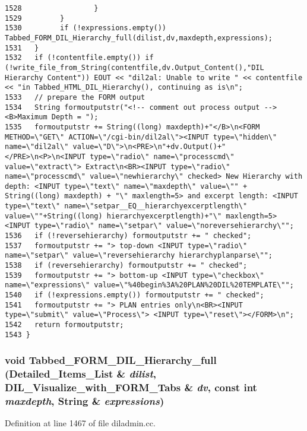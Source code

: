 \begin{verbatim}
1528                 }
1529         }
1530         if (!expressions.empty()) Tabbed_FORM_DIL_Hierarchy_full(dilist,dv,maxdepth,expressions);
1531   }
1532   if (!contentfile.empty()) if (!write_file_from_String(contentfile,dv.Output_Content(),"DIL Hierarchy Content")) EOUT << "dil2al: Unable to write " << contentfile << "in Tabbed_HTML_DIL_Hierarchy(), continuing as is\n";
1533   // prepare the FORM output
1534   String formoutputstr("<!-- comment out process output --><B>Maximum Depth = ");
1535   formoutputstr += String((long) maxdepth)+"</B>\n<FORM METHOD=\"GET\" ACTION=\"/cgi-bin/dil2al\"><INPUT type=\"hidden\" name=\"dil2al\" value=\"D\">\n<PRE>\n"+dv.Output()+"</PRE>\n<P>\n<INPUT type=\"radio\" name=\"processcmd\" value=\"extract\"> Extract\n<BR><INPUT type=\"radio\" name=\"processcmd\" value=\"newhierarchy\" checked> New Hierarchy with depth: <INPUT type=\"text\" name=\"maxdepth\" value=\"" + String((long) maxdepth) + "\" maxlength=5> and excerpt length: <INPUT type=\"text\" name=\"setpar__EQ__hierarchyexcerptlength\" value=\""+String((long) hierarchyexcerptlength)+"\" maxlength=5> <INPUT type=\"radio\" name=\"setpar\" value=\"noreversehierarchy\"";
1536   if (!reversehierarchy) formoutputstr += " checked";
1537   formoutputstr += "> top-down <INPUT type=\"radio\" name=\"setpar\" value=\"reversehierarchy hierarchyplanparse\"";
1538   if (reversehierarchy) formoutputstr += " checked";
1539   formoutputstr += "> bottom-up <INPUT type=\"checkbox\" name=\"expressions\" value=\"%40begin%3A%20PLAN%20DIL%20TEMPLATE\"";
1540   if (!expressions.empty()) formoutputstr += " checked";
1541   formoutputstr += "> PLAN entries only\n<BR><INPUT type=\"submit\" value=\"Process\"> <INPUT type=\"reset\"></FORM>\n";
1542   return formoutputstr;
1543 }
\end{verbatim}\normalsize 
{}
\subsubsection{\setlength{\rightskip}{0pt plus 5cm}void Tabbed\_\-FORM\_\-DIL\_\-Hierarchy\_\-full ({\bf Detailed\_\-Items\_\-List} \& {\em dilist}, {\bf DIL\_\-Visualize\_\-with\_\-FORM\_\-Tabs} \& {\em dv}, const int {\em maxdepth}, {\bf String} \& {\em expressions})}\label{diladmin_8cc_a23}




Definition at line 1467 of file diladmin.cc.

